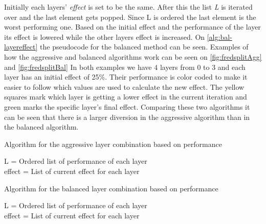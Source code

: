 Initially each layers' \textit{effect} is set to be the same.
After this the list \textit{L} is iterated over and the last element gets popped.
Since L is ordered the last element is the worst performing one.
Based on the initial effect and the performance of the layer its effect is lowered while the other layers effect is increased.
On \autoref{alg:bal-layereffect} the pseudocode for the balanced method can be seen.
Examples of how the aggressive and balanced algorithms work can be seen on \autoref{fig:fredsplitAgg} and \autoref{fig:fredsplitBal}
In both examples we have 4 layers from 0 to 3 and each layer has an initial effect of 25\%.
Their performance is color coded to make it easier to follow which values are used to calculate the new effect.
The yellow squares mark which layer is getting a lower effect in the current iteration and green marks the specific layer's final effect.
Comparing these two algorithms it can be seen that there is a larger diversion in the aggressive algorithm than in the balanced algorithm.
\begin{algorithm}
    \caption{Algorithm for the aggressive layer combination based on performance}
    \SetAlgoLined
    L = Ordered list of performance of each layer \\
    effect  = List of current effect for each layer \\
    \label{alg:aggresive-layereffect}
\end{algorithm}

\begin{algorithm}
    \caption{Algorithm for the balanced layer combination based on performance}
    \SetAlgoLined
    L = Ordered list of performance of each layer \\
    effect  = List of current effect for each layer \\
    \label{alg:bal-layereffect}
\end{algorithm}


